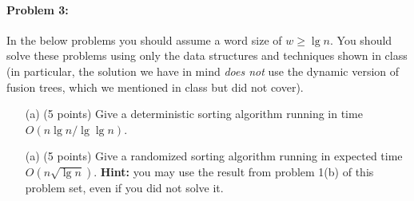 \documentclass[12pt]{article}
\begin{document}
\paragraph{Problem 3:} In the below problems you should assume a word size of $w\ge \lg n$. You should solve these problems using only the data structures and techniques shown in class (in particular, the solution we have in mind {\em does not} use the dynamic version of fusion trees, which we mentioned in class but did not cover).
\begin{itemize}
\item[(a)] (5 points) Give a deterministic sorting algorithm running in time $O(n\lg n / \lg\lg n)$.
\item[(a)] (5 points) Give a randomized sorting algorithm running in expected time $O(n\sqrt{\lg n})$. \textbf{Hint:} you may use the result from problem 1(b) of this problem set, even if you did not solve it.
\end{itemize}
\end{document}
